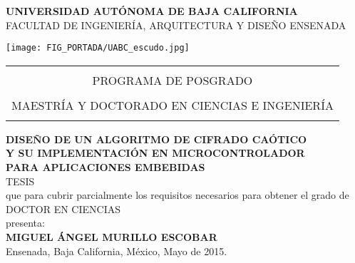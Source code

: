 
\thispagestyle{empty} %


\begin{center}

\Large{\textbf{UNIVERSIDAD AUTÓNOMA DE BAJA CALIFORNIA}} \\
\vspace{0.6cm} %
\large{FACULTAD DE INGENIERÍA, ARQUITECTURA Y DISEÑO ENSENADA}

\vspace{1.1cm} %
\texttt{[image: FIG\_PORTADA/UABC\_escudo.jpg]} \\
\vspace{1.1cm} %

\begin{tabular}{c}
\hline \\
\large{PROGRAMA DE POSGRADO} \\ \\
\large{MAESTRÍA Y DOCTORADO EN CIENCIAS E INGENIERÍA} \\ \\
\hline 
\end{tabular} 

\vspace{.7cm} %
\large{\textbf{DISEÑO DE UN ALGORITMO DE CIFRADO CAÓTICO \\Y SU IMPLEMENTACIÓN EN MICROCONTROLADOR \\PARA APLICACIONES EMBEBIDAS}} \\ 
\vspace{.7cm} %
\large{TESIS} \\ 
\vspace{.4cm} %
que para cubrir parcialmente los requisitos necesarios para obtener el grado de  \\ 
\vspace{.4cm} %
\large{DOCTOR EN CIENCIAS}  \\ 
\vspace{.4cm} %
presenta:  \\ 
\vspace{.4cm} %
\Large{\textbf{MIGUEL ÁNGEL MURILLO ESCOBAR}}  \\ 
\vspace{.4cm} %
\small{Ensenada, Baja California, México, Mayo de 2015.}


\end{center}

\thispagestyle{empty}
\clearpage
